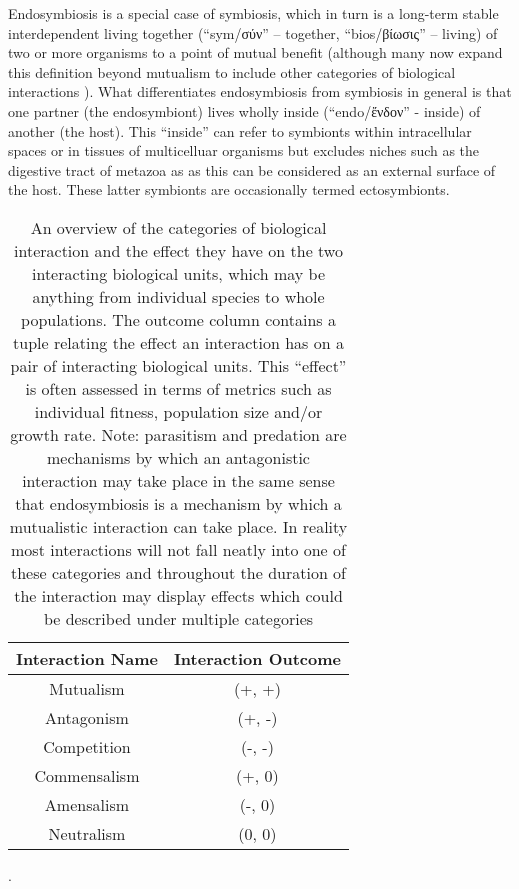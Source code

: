 Endosymbiosis is a special case of symbiosis, which in turn is a long-term stable interdependent 
living together (``sym/σύν'' -- together, ``bios/βίωσις'' -- living) of two or more 
organisms to a point of mutual benefit \citep{DeBary1869,Pound1893} (although many now expand 
this definition beyond mutualism to include other categories of biological interactions \citep{Leung2008,OMalley2015}).
What differentiates endosymbiosis from symbiosis in general is that one partner (the endosymbiont) lives wholly
inside (``endo/ἔνδον'' - inside) of another (the host). This ``inside'' can refer to symbionts within intracellular
spaces or in tissues of multicelluar organisms but excludes niches such as the digestive tract of metazoa as 
as this can be considered as an external surface of the host. These latter symbionts are occasionally termed ectosymbionts.
\begin{table}[h]
    \begin{tabular}{@{}cc@{}}
        \toprule
        \multicolumn{1}{r}{\textbf{Interaction Name}} & \multicolumn{1}{l}{\textbf{Interaction Outcome}} \\ 
        \midrule
        \multicolumn{1}{|c|}{Mutualism}               & \multicolumn{1}{c|}{(+, +)}                      \\
        \multicolumn{1}{|c|}{Antagonism}              & \multicolumn{1}{c|}{(+, -)}                      \\
        \multicolumn{1}{|c|}{Competition}             & \multicolumn{1}{c|}{(-, -)}                      \\
        \multicolumn{1}{|c|}{Commensalism}            & \multicolumn{1}{c|}{(+, 0)}                      \\
        \multicolumn{1}{|c|}{Amensalism}              & \multicolumn{1}{c|}{(-, 0)}                      \\
        \multicolumn{1}{|c|}{Neutralism}              & \multicolumn{1}{c|}{(0, 0)}                      \\ 
        \bottomrule
    \end{tabular}
    \caption{An overview of the categories of biological interaction and the effect they have on the two interacting
        biological units, which may be anything from individual species to whole populations. The outcome column 
        contains a tuple relating the effect an interaction has on a pair of interacting biological units. 
        This ``effect'' is often assessed in terms of metrics such as individual fitness, population size and/or
        growth rate.
        Note: parasitism and predation are mechanisms by which an antagonistic interaction may take place \citep{Abrams1987}
        in the same sense that endosymbiosis is a mechanism by which a mutualistic interaction can take place.
        In reality most interactions will not fall neatly into one of these categories and throughout the duration
        of the interaction may display effects which could be described under multiple categories \citep{Leung2008}}. 
    \label{table:biointeractions}
\end{table}


